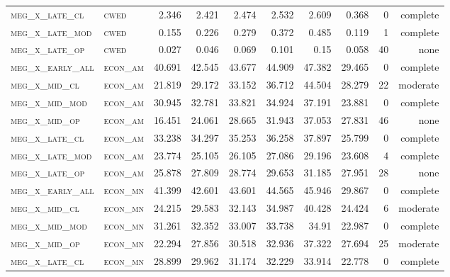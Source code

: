 \begin{landscape}
\begin{center}
\begin{footnotesize}
\begin{longtable}{llrrrrr|rrr}
\textsc{meg\_x\_late\_cl  } & \textsc{cwed      }    & 2.346    & 2.421    & 2.474    & 2.532    & 2.609    & 0.368    & 0   & complete \\
\textsc{meg\_x\_late\_mod } & \textsc{cwed      }    & 0.155    & 0.226    & 0.279    & 0.372    & 0.485    & 0.119    & 1   & complete \\
\textsc{meg\_x\_late\_op  } & \textsc{cwed      }    & 0.027    & 0.046    & 0.069    & 0.101    & 0.15     & 0.058    & 40  & none     \\
\textsc{meg\_x\_early\_all} & \textsc{econ\_am  }    & 40.691   & 42.545   & 43.677   & 44.909   & 47.382   & 29.465   & 0   & complete \\
\textsc{meg\_x\_mid\_cl   } & \textsc{econ\_am  }    & 21.819   & 29.172   & 33.152   & 36.712   & 44.504   & 28.279   & 22  & moderate \\
\textsc{meg\_x\_mid\_mod  } & \textsc{econ\_am  }    & 30.945   & 32.781   & 33.821   & 34.924   & 37.191   & 23.881   & 0   & complete \\
\textsc{meg\_x\_mid\_op   } & \textsc{econ\_am  }    & 16.451   & 24.061   & 28.665   & 31.943   & 37.053   & 27.831   & 46  & none     \\
\textsc{meg\_x\_late\_cl  } & \textsc{econ\_am  }    & 33.238   & 34.297   & 35.253   & 36.258   & 37.897   & 25.799   & 0   & complete \\
\textsc{meg\_x\_late\_mod } & \textsc{econ\_am  }    & 23.774   & 25.105   & 26.105   & 27.086   & 29.196   & 23.608   & 4   & complete \\
\textsc{meg\_x\_late\_op  } & \textsc{econ\_am  }    & 25.878   & 27.809   & 28.774   & 29.653   & 31.185   & 27.951   & 28  & none     \\
\textsc{meg\_x\_early\_all} & \textsc{econ\_mn  }    & 41.399   & 42.601   & 43.601   & 44.565   & 45.946   & 29.867   & 0   & complete \\
\textsc{meg\_x\_mid\_cl   } & \textsc{econ\_mn  }    & 24.215   & 29.583   & 32.143   & 34.987   & 40.428   & 24.424   & 6   & moderate \\
\textsc{meg\_x\_mid\_mod  } & \textsc{econ\_mn  }    & 31.261   & 32.352   & 33.007   & 33.738   & 34.91    & 22.987   & 0   & complete \\
\textsc{meg\_x\_mid\_op   } & \textsc{econ\_mn  }    & 22.294   & 27.856   & 30.518   & 32.936   & 37.322   & 27.694   & 25  & moderate \\
\textsc{meg\_x\_late\_cl  } & \textsc{econ\_mn  }    & 28.899   & 29.962   & 31.174   & 32.229   & 33.914   & 22.778   & 0   & complete \\

\end{longtable}
\end{footnotesize}
\end{center}
\end{landscape}
